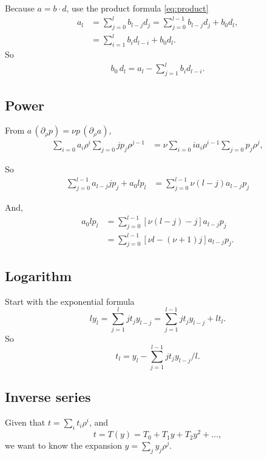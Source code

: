 \documentclass[aip,jcp,reprint,superscriptaddress]{revtex4-1}
\numberwithin{equation}{subsection}
\begin{document}
Because $a = b \cdot d$,
use the product formula \eqref{eq:product}
\begin{align*}
  a_l
  &= \sum_{j = 0}^{l} b_{l-j} d_j
  = \sum_{j = 0}^{l - 1} b_{l - j} d_j + b_0 d_l,
\\
  &= \sum_{i = 1}^{l} b_{i} d_{l - i} + b_0 d_l.
\end{align*}
So
\begin{align*}
  b_0 \, d_l = a_l -\sum_{j = 1}^{l} b_{i} d_{l - i}.
\end{align*}


\subsection{Power}

From $a \, (\partial_\rho p) = \nu p \, (\partial_\rho a)$,
%
\begin{align*}
  \sum_{i = 0} a_i \rho^i
  \sum_{j = 0} j p_j \rho^{j - 1}
&=
  \nu
  \sum_{i = 0} i a_i \rho^{i - 1}
  \sum_{j = 0} p_j \rho^{j},
\end{align*}

So
\begin{align*}
  \sum_{j = 0}^{l-1} a_{l-j} j p_j + a_0 l p_l
&=
  \sum_{j = 0}^{l-1} \nu (l - j) a_{l - j} p_j
\end{align*}

And,
\begin{align*}
  a_0 l p_l
&=
  \sum_{j = 0}^{l-1} [ \nu (l - j) - j] a_{l - j} p_j
\\
&=
  \sum_{j = 0}^{l-1} [ \nu l - (\nu + 1) j] a_{l - j} p_j.
\end{align*}


\subsection{Logarithm}

Start with the exponential formula
\[
  l y_l = \sum_{j = 1}^l j t_j y_{l - j}
  = \sum_{j = 1}^{l - 1} j t_j y_{l - j} + l t_l.
\]
So
\[
  t_l = y_l - \sum_{j = 1}^{l-1} j t_j y_{l - j}/l.
\]


\subsection{Inverse series}

Given that $t = \sum_i t_i \rho^i$, and
\begin{equation}
  t = T(y) = T_0 + T_1 y + T_2 y^2 + \dots,
  \label{eq:tTy}
\end{equation}
we want to know the expansion $y = \sum_j y_j \rho^j$.
\end{document}
